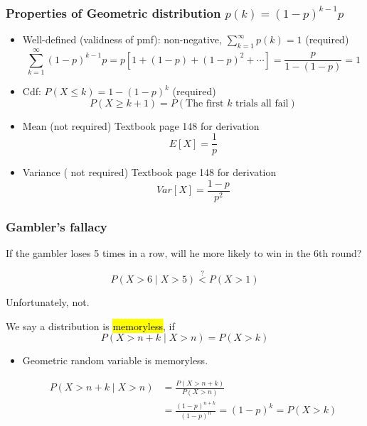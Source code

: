\documentclass[slidestop,compress,mathserif]{beamer}
\begin{document}
\begin{frame}\frametitle{Properties of Geometric distribution $p(k) = (1-p)^{k-1}p$}

\begin{itemize}
\item Well-defined (validness of pmf): non-negative, $\sum_{k = 1}^{\infty} p(k) = 1$  ({\color{red}required})\\
\vspace{-0.3cm}
\[\sum_{k = 1}^{\infty}(1-p)^{k-1}p =  p[1 + (1-p) + (1-p)^2 + \cdots] = \frac{p}{1-(1-p)}=1 \]

\vspace{0.5cm}
\pause
\item Cdf: $P(X \leq k) = 1 - (1-p)^k$  ({\color{red}required})\\
\vspace{-0.3cm}
\[ P(X \geq k + 1) = P(\text{The first } k \text{ trials all fail}) \]

\item Mean ({\color{red}not required}) Textbook page 148 for derivation
\[E[X] = \frac{1}{p} \]

\item Variance ({\color{red} not required}) Textbook page 148 for derivation
\[Var[X] = \frac{1-p}{p^2} \]
\end{itemize}

\end{frame}


\begin{frame}\frametitle{Gambler's fallacy}
If the gambler loses 5 times in a row, will he more likely to win in the 6th round?

\[
P(X > 6 \mid X > 5) \stackrel{?}{<} P(X > 1)
\]

Unfortunately, not.

\begin{defn}
We say a distribution is \hl{memoryless}, if
\[ P(X > n + k \mid X > n) = P(X > k)\]
\end{defn}


\begin{itemize}
\item Geometric random variable is memoryless.


\begin{align*}
P(X > n + k \mid X > n) %
& = \frac{P(X > n + k)}{P(X > n)} \\
& = \frac{(1-p)^{n+k}}{(1-p)^n} = (1-p)^k = P(X > k)
\end{align*}

\end{itemize}

\end{frame}
\end{document}
